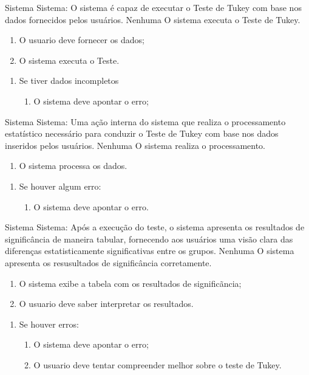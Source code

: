 {Sistema}
{Sistema: O sistema é capaz de executar o Teste de Tukey com base nos dados fornecidos pelos usuários.}
{Nenhuma}
{O sistema executa o Teste de Tukey.}
{
	\begin{enumerate}[label=FB\arabic*.]
		\item O usuario deve fornecer os dados;
		\item O sistema executa o Teste.
		
	\end{enumerate}
}{
	\begin{enumerate}[label=FA\arabic*.]
		\item Se tiver dados incompletos
			\begin{enumerate}
				\item O sistema deve apontar o erro;
			\end{enumerate}
	\end{enumerate}
}{}{}

{Sistema}
{Sistema: Uma ação interna do sistema que realiza o processamento estatístico necessário para conduzir o Teste de Tukey com base nos dados inseridos pelos usuários.}
{Nenhuma}
{O sistema realiza o processamento.}
{
	\begin{enumerate}[label=FB\arabic*.]
		\item O sistema processa os dados.
	
	\end{enumerate}
}{
	\begin{enumerate}[label=FA\arabic*.]
		\item Se houver algum erro:
			\begin{enumerate}
				\item O sistema deve apontar o erro.
			\end{enumerate}
	\end{enumerate}
}{}{}

{Sistema}
{Sistema: Após a execução do teste, o sistema apresenta os resultados de significância de maneira tabular, fornecendo aos usuários uma visão clara das diferenças estatisticamente significativas entre os grupos.
}
{Nenhuma}
{O sistema apresenta os resusultados de significância corretamente.}
{
	\begin{enumerate}[label=FB\arabic*.]
		\item O sistema exibe a tabela com os resultados de significãncia;
		\item O usuario deve saber interpretar os resultados.
	\end{enumerate}
}{
	\begin{enumerate}[label=FA\arabic*.]
		\item Se houver erros:
			\begin{enumerate}
				\item O sistema deve apontar o erro;
				\item O usuario deve tentar compreender melhor sobre o teste de Tukey.
			\end{enumerate}
	\end{enumerate}
}{}{}

